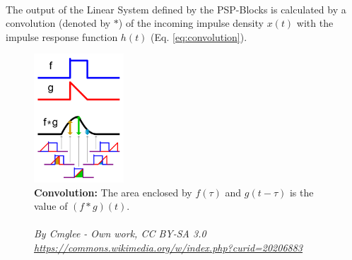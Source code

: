 \\[2em]
The output of the Linear System defined by the PSP-Blocks is calculated by a convolution (denoted by $\ast$) of the incoming impulse density $x(t)$ with the impulse response function $h(t)$ (Eq. \ref{eq:convolution}).
\begin{figure}
    \centering
    \includegraphics[width=0.30\textwidth]{Figures/convolution/wikipedia-citation-needed}
    \caption{\textbf{Convolution:} The area enclosed by $f(\tau)$ and $g(t-\tau)$ is the value of $(f\ast g)(t)$.\\
    \hrulefill \\
    \textit{By Cmglee - Own work, CC BY-SA 3.0  \url{https://commons.wikimedia.org/w/index.php?curid=20206883}}}
    \label{fig:Convolution}
\end{figure}

